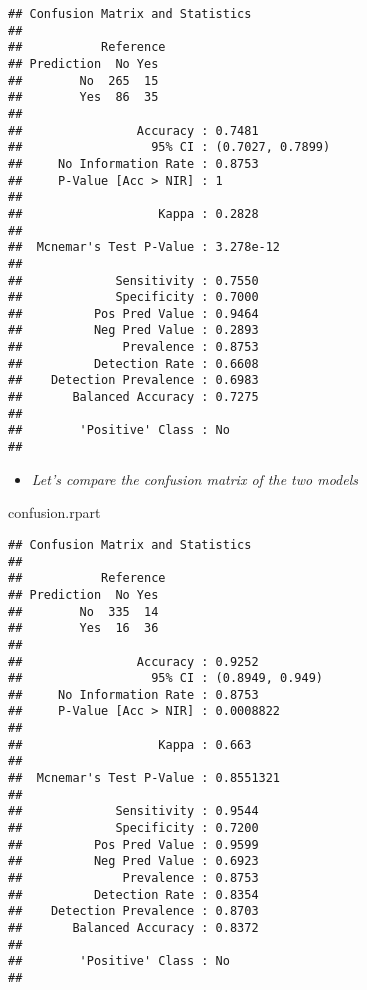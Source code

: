\documentclass[]{article}
\newenvironment{Shaded}{\begin{snugshade}}{\end{snugshade}}
\newcommand{\NormalTok}[1]{#1}
\providecommand{\tightlist}{%
  \setlength{\itemsep}{0pt}\setlength{\parskip}{0pt}}
\begin{document}
\begin{verbatim}
## Confusion Matrix and Statistics
## 
##           Reference
## Prediction  No Yes
##        No  265  15
##        Yes  86  35
##                                           
##                Accuracy : 0.7481          
##                  95% CI : (0.7027, 0.7899)
##     No Information Rate : 0.8753          
##     P-Value [Acc > NIR] : 1               
##                                           
##                   Kappa : 0.2828          
##                                           
##  Mcnemar's Test P-Value : 3.278e-12       
##                                           
##             Sensitivity : 0.7550          
##             Specificity : 0.7000          
##          Pos Pred Value : 0.9464          
##          Neg Pred Value : 0.2893          
##              Prevalence : 0.8753          
##          Detection Rate : 0.6608          
##    Detection Prevalence : 0.6983          
##       Balanced Accuracy : 0.7275          
##                                           
##        'Positive' Class : No              
## 
\end{verbatim}

\begin{itemize}
\tightlist
\item
  \emph{Let's compare the confusion matrix of the two models}
\end{itemize}

\begin{Shaded}
\begin{Highlighting}[]
\NormalTok{confusion.rpart}
\end{Highlighting}
\end{Shaded}

\begin{verbatim}
## Confusion Matrix and Statistics
## 
##           Reference
## Prediction  No Yes
##        No  335  14
##        Yes  16  36
##                                          
##                Accuracy : 0.9252         
##                  95% CI : (0.8949, 0.949)
##     No Information Rate : 0.8753         
##     P-Value [Acc > NIR] : 0.0008822      
##                                          
##                   Kappa : 0.663          
##                                          
##  Mcnemar's Test P-Value : 0.8551321      
##                                          
##             Sensitivity : 0.9544         
##             Specificity : 0.7200         
##          Pos Pred Value : 0.9599         
##          Neg Pred Value : 0.6923         
##              Prevalence : 0.8753         
##          Detection Rate : 0.8354         
##    Detection Prevalence : 0.8703         
##       Balanced Accuracy : 0.8372         
##                                          
##        'Positive' Class : No             
## 
\end{verbatim}
\end{document}
